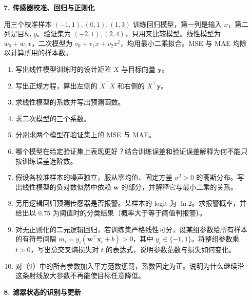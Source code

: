 \noindent\textbf{7. 传感器校准、回归与正则化}

用三个校准样本 $(-1,1),(0,1),(1,3)$ 训练回归模型，第一列是输入 $x$，第二列是目标 $y$。验证集为 $(-2,1),(2,4)$，只用来比较模型。线性模型为 $w_0+w_1x$，二次模型为 $v_0+v_1x+v_2x^2$，均用最小二乘拟合。MSE 与 MAE 均除以计算所用的样本数。

\begin{enumerate}[label=(\arabic*)]
\item 写出线性模型训练时的设计矩阵 $X$ 与目标向量 $\bm y$。
\item 写出正规方程，算出左侧的 $X^\top X$ 和右侧的 $X^\top\bm y$。
\item 求线性模型的系数并写出预测函数。
\item 求二次模型的三个系数。
\item 分别求两个模型在验证集上的 MSE 与 MAE。
\item 哪个模型在给定验证集上表现更好？结合训练误差和验证误差解释为何不能只按训练误差选阶数。
\item 假设各校准样本的噪声独立，服从零均值、固定方差 $\sigma^2>0$ 的高斯分布。写出线性模型的负对数似然中依赖 $\bm w$ 的部分，并解释它与最小二乘的关系。
\item 另用逻辑回归预测传感器是否报警。某样本的 logit 为 $\ln 2$。求报警概率，并给出以 $0.75$ 为阈值时的分类结果（概率大于等于阈值判报警）。
\item 对无正则化的二元逻辑回归，若训练集严格线性可分，设某组参数给所有样本的有符号间隔 $m_i=y_i(\bm w^\top\bm x_i+b)>0$，其中 $y_i\in\{-1,1\}$。将整组参数乘 $t>0$，写出总交叉熵损失对 $t$ 的表达式，说明参数范数与损失如何变化。
\item 对（9）中的所有参数加入平方范数惩罚，系数固定为正。说明为什么继续沿这条射线放大参数不再能使目标任意降低。
\end{enumerate}

\noindent\textbf{8. 滤器状态的识别与更新}

